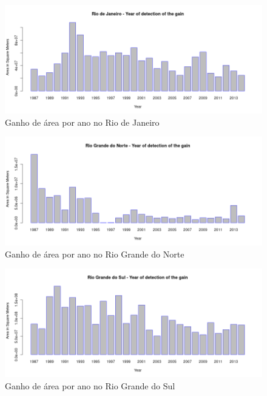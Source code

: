 \begin{figure}[H]
    \centering
    \includegraphics[scale=.5]{images/gain_graphics/Rio de Janeiro_gain.png}
    \caption{Ganho de área por ano no Rio de Janeiro}
    \label{fig:gain_rio_de_janeiro}
\end{figure}

\begin{figure}[H]
    \centering
    \includegraphics[scale=.5]{images/gain_graphics/Rio Grande do Norte_gain.png}
    \caption{Ganho de área por ano no Rio Grande do Norte}
    \label{fig:gain_rio_grande_do_norte}
\end{figure}

\begin{figure}[H]
    \centering
    \includegraphics[scale=.5]{images/gain_graphics/Rio Grande do Sul_gain.png}
    \caption{Ganho de área por ano no Rio Grande do Sul}
    \label{fig:gain_rio_grande_do_sul}
\end{figure}

